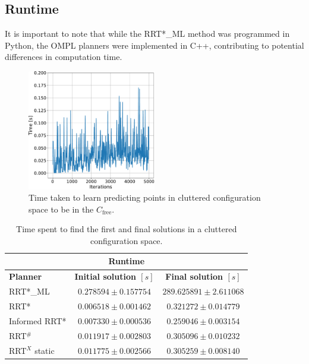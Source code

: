 \documentclass{ctuthesis}
\begin{document}
\subsection{Runtime}
It is important to note that while the RRT*\_ML method was programmed in Python, 
the OMPL planners were implemented in C++, 
contributing to potential differences in computation time.
\begin{figure}[!ht]
  \centering 
  \includegraphics[width=0.5\textwidth]{figChap5/graph_clutter_learning_time.pdf}   
  \caption{Time taken to learn predicting points in cluttered configuration space 
  to be in the \(C_{\text{free}}\).}
  \label{fig:graph_learning_time}
\end{figure}
\begin{table}[!ht]
  \centering
  \begin{tabular}{ |p{3cm}|c|c| }
    \hline
    \multicolumn{3}{|c|}{\textbf{Runtime}} \\
    \hline
    \textbf{Planner} & \textbf{Initial solution $[s]$} & \textbf{Final solution $[s]$} \\
    \hline
    RRT*\_ML         & $0.278594 \pm 0.157754$ & $289.625891 \pm 2.611068$ \\
    RRT*             & $0.006518 \pm 0.001462$ & $0.321272 \pm 0.014779$ \\
    Informed RRT*    & $0.007330 \pm 0.000536$ & $0.259046 \pm 0.003154$ \\
    RRT$^\#$         & $0.011917 \pm 0.002803$ & $0.305096 \pm 0.010232$ \\
    RRT$^X$ static   & $0.011775 \pm 0.002566$ & $0.305259 \pm 0.008140$ \\
    \hline
  \end{tabular}
  \caption{Time spent to find the first and final solutions in a cluttered configuration space.}
  \label{tab:time_clutter2D}
\end{table}
\end{document}
